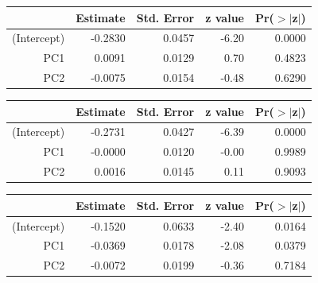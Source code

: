 \documentclass[a4paper,12pt]{Latex/Classes/PhDthesisPSnPDF}
\begin{document}
\begin{center}
\begin{table}[ht]
\centering
\begin{tabular}{rrrrr}
  \hline
 & Estimate & Std. Error & z value & Pr($>$$|$z$|$) \\ 
  \hline
(Intercept) & -0.2830 & 0.0457 & -6.20 & 0.0000 \\ 
  PC1 & 0.0091 & 0.0129 & 0.70 & 0.4823 \\ 
  PC2 & -0.0075 & 0.0154 & -0.48 & 0.6290 \\ 
   \hline
\end{tabular}
\end{table}\end{center}
\begin{center}
\begin{table}[ht]
\centering
\begin{tabular}{rrrrr}
  \hline
 & Estimate & Std. Error & z value & Pr($>$$|$z$|$) \\ 
  \hline
(Intercept) & -0.2731 & 0.0427 & -6.39 & 0.0000 \\ 
  PC1 & -0.0000 & 0.0120 & -0.00 & 0.9989 \\ 
  PC2 & 0.0016 & 0.0145 & 0.11 & 0.9093 \\ 
   \hline
\end{tabular}
\end{table}\end{center}

\newpage

\begin{center}
\begin{table}[ht]
\centering
\begin{tabular}{rrrrr}
  \hline
 & Estimate & Std. Error & z value & Pr($>$$|$z$|$) \\ 
  \hline
(Intercept) & -0.1520 & 0.0633 & -2.40 & 0.0164 \\ 
  PC1 & -0.0369 & 0.0178 & -2.08 & 0.0379 \\ 
  PC2 & -0.0072 & 0.0199 & -0.36 & 0.7184 \\ 
   \hline
\end{tabular}
\end{table}\end{center}
\end{document}
